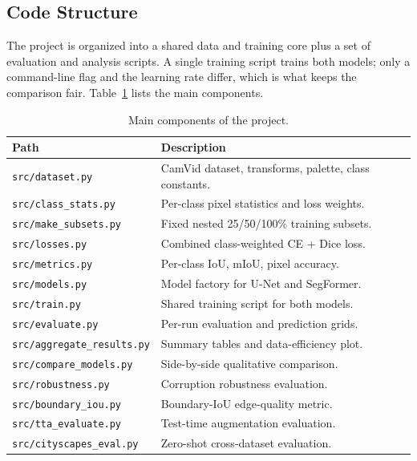 \documentclass[11pt,a4paper]{article}
\begin{document}
\subsection{Code Structure}

The project is organized into a shared data and training core plus a set of
evaluation and analysis scripts. A single training script trains both models;
only a command-line flag and the learning rate differ, which is what keeps the
comparison fair. Table~\ref{tab:structure} lists the main components.

\begin{table}[H]
\centering
\begin{tabular}{ll}
\toprule
Path & Description \\
\midrule
\texttt{src/dataset.py}        & CamVid dataset, transforms, palette, class constants. \\
\texttt{src/class\_stats.py}   & Per-class pixel statistics and loss weights. \\
\texttt{src/make\_subsets.py}  & Fixed nested 25/50/100\% training subsets. \\
\texttt{src/losses.py}         & Combined class-weighted CE + Dice loss. \\
\texttt{src/metrics.py}        & Per-class IoU, mIoU, pixel accuracy. \\
\texttt{src/models.py}         & Model factory for U-Net and SegFormer. \\
\texttt{src/train.py}          & Shared training script for both models. \\
\texttt{src/evaluate.py}       & Per-run evaluation and prediction grids. \\
\texttt{src/aggregate\_results.py} & Summary tables and data-efficiency plot. \\
\texttt{src/compare\_models.py}    & Side-by-side qualitative comparison. \\
\texttt{src/robustness.py}     & Corruption robustness evaluation. \\
\texttt{src/boundary\_iou.py}  & Boundary-IoU edge-quality metric. \\
\texttt{src/tta\_evaluate.py}  & Test-time augmentation evaluation. \\
\texttt{src/cityscapes\_eval.py} & Zero-shot cross-dataset evaluation. \\
\bottomrule
\end{tabular}
\caption{Main components of the project.}
\label{tab:structure}
\end{table}
\end{document}
